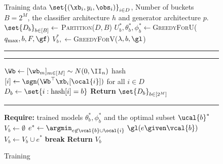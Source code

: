 \documentclass[letterpaper]{article}
\begin{document}
 \begin{figure}[H]
\begin{minipage}{0.48\textwidth}
\begin{algorithm}[H]
\small
\caption{Training}
\begin{algorithmic}[1]
    \REQUIRE Training data $\set{(\xb_i,y_i,\obs_i)}_{i\in D}$, Number of buckets $B=2^M$, the classifier architecture $h$ and generator architecture $p$.
        \STATE $\set{D_b}_{b\in[B]}\leftarrow$ \textsc{Partition}($D,B$)
        \STATE $U_b ^*, \theta^* _b , \phi^* _b  \gets $\textsc{GreedyForU}($q_{\max},b, F, \gf)$
        \STATE $V_b ^*, \gets $\textsc{GreedyForV}($\lambda,b, \gl$)
        \ENDFOR

            \end{algorithmic}
\hrule
\hrule
\begin{algorithmic}[1]
        \STATE $\Wb \leftarrow [\wb_m]_{m \in [M]}\sim N(0,\II_{n})$
        \STATE hash$[i]\leftarrow \sgn(\Wb^{\top} \xb_i [\ocal{i}])$ for all $i\in D$
        \STATE $D_b \leftarrow \set{i:\text{hash}[i]=b}$
        \STATE \textbf{Return} $\set{D_b}_{b\in [2^M]}$
    \ENDFUNCTION
    \end{algorithmic}

\hrule
\begin{algorithmic}[1]
    \STATE \textbf{Require:} trained models $\theta^* _b, \phi^* _b$ and the optimal subset $\ucal{b}^*$
    \STATE $V_b \leftarrow \emptyset$
         \STATE $e^* \gets  {\argmin}_{e\not\in \vcal{b}\cup \ocal{i}} \ \gl(e  \given \vcal{b} ) $
           \STATE $V_b \gets V_b \cup e^*$
           \STATE \textbf{break}
          \ENDIF
         \ENDFOR
        \STATE \textbf{Return} $V_b$
    \ENDFUNCTION

\end{algorithmic}
\label{alg:training}
\end{algorithm}
\end{minipage} \hspace{3mm}
\end{figure}
\end{document}
